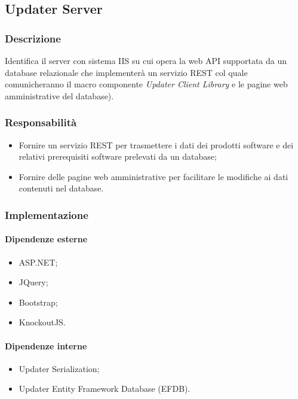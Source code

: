 \documentclass[../RelazioneFinale.tex]{subfiles}
\begin{document}
\newpage
		
		\subsection{Updater Server}

			\subsubsection{Descrizione}
				Identifica il server con sistema IIS su cui opera la web API supportata da un database relazionale che implementerà un servizio REST col quale comunicheranno il macro componente \emph{Updater Client Library} e le pagine web amministrative del database).
			
			\subsubsection{Responsabilità}
				\begin{itemize}
					\item Fornire un servizio REST per trasmettere i dati dei prodotti software e dei relativi prerequisiti software prelevati da un database;
					\item Fornire delle pagine web amministrative per facilitare le modifiche ai dati contenuti nel database.
				\end{itemize}
			
			\subsubsection{Implementazione}
			
				\paragraph{Dipendenze esterne}
					\begin{itemize}
						\item ASP.NET;
						\item JQuery;
						\item Bootstrap;
						\item KnockoutJS.
					\end{itemize}
				
				\paragraph{Dipendenze interne}
					\begin{itemize}
						\item Updater Serialization;
						\item Updater Entity Framework Database (EFDB).
					\end{itemize}
				
\end{document}
